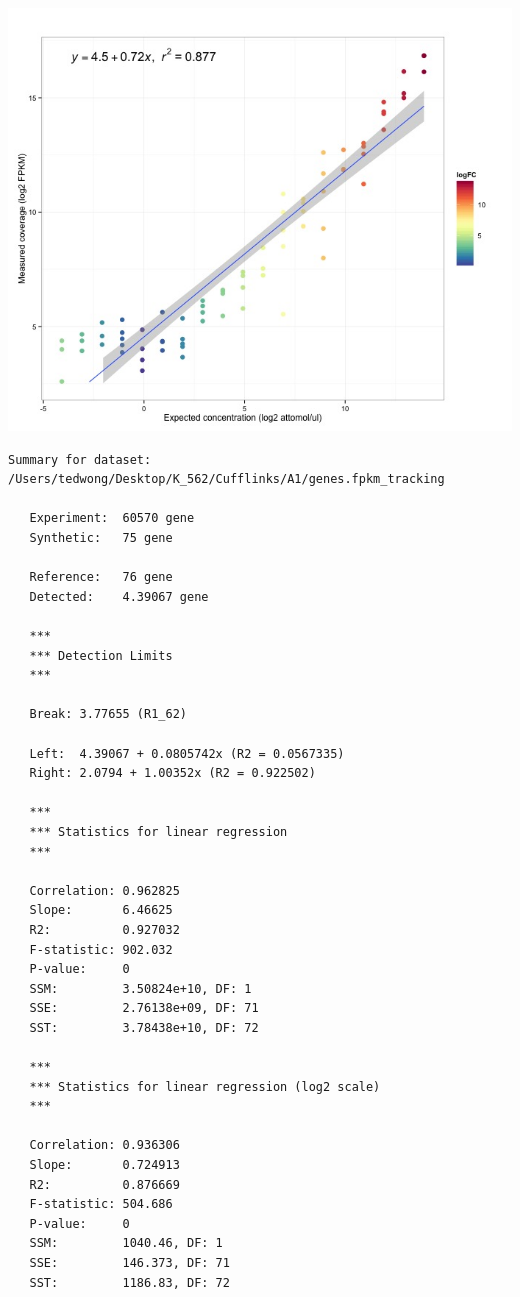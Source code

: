 \documentclass[]{article}
\begin{document}
\includegraphics{samples/TransExpress_Sample.jpeg}

\pagebreak

\begin{verbatim}
Summary for dataset: /Users/tedwong/Desktop/K_562/Cufflinks/A1/genes.fpkm_tracking

   Experiment:  60570 gene
   Synthetic:   75 gene

   Reference:   76 gene
   Detected:    4.39067 gene

   ***
   *** Detection Limits
   ***

   Break: 3.77655 (R1_62)

   Left:  4.39067 + 0.0805742x (R2 = 0.0567335)
   Right: 2.0794 + 1.00352x (R2 = 0.922502)

   ***
   *** Statistics for linear regression
   ***

   Correlation: 0.962825
   Slope:       6.46625
   R2:          0.927032
   F-statistic: 902.032
   P-value:     0
   SSM:         3.50824e+10, DF: 1
   SSE:         2.76138e+09, DF: 71
   SST:         3.78438e+10, DF: 72

   ***
   *** Statistics for linear regression (log2 scale)
   ***

   Correlation: 0.936306
   Slope:       0.724913
   R2:          0.876669
   F-statistic: 504.686
   P-value:     0
   SSM:         1040.46, DF: 1
   SSE:         146.373, DF: 71
   SST:         1186.83, DF: 72
\end{verbatim}
\end{document}

